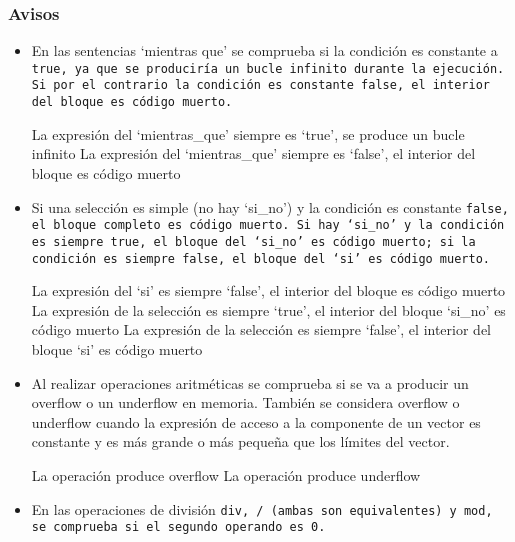 \subsubsection{Avisos}
\label{avisos}

\begin{itemize}
    \item En las sentencias `mientras que' se comprueba si la condición es constante a \tt{true}, ya que se produciría un bucle infinito durante la ejecución. Si por el contrario la condición es constante \tt{false}, el interior del bloque es código muerto.

    \begin{codigo}
    La expresión del `mientras_que' siempre es `true', se produce un bucle infinito
    La expresión del `mientras_que' siempre es `false', el interior del bloque es código muerto
    \end{codigo}

    \item Si una selección es simple (no hay `si\_no') y la condición es constante \tt{false}, el bloque completo es código muerto. Si hay `si\_no' y la condición es siempre \tt{true}, el bloque del `si\_no' es código muerto; si la condición es siempre \tt{false}, el bloque del `si' es código muerto.

    \begin{codigo}
    La expresión del `si' es siempre `false', el interior del bloque es código muerto
    La expresión de la selección es siempre `true', el interior del bloque `si_no' es código muerto
    La expresión de la selección es siempre `false', el interior del bloque `si' es código muerto
    \end{codigo}

    \item Al realizar operaciones aritméticas se comprueba si se va a producir un overflow o un underflow en memoria. También se considera overflow o underflow cuando la expresión de acceso a la componente de un vector es constante y es más grande o más pequeña que los límites del vector.

    \begin{codigo}
    La operación produce overflow
    La operación produce underflow
    \end{codigo}

    \item En las operaciones de división \tt{div}, \tt{/} (ambas son equivalentes) y \tt{mod}, se comprueba si el segundo operando es 0.


\end{itemize}
